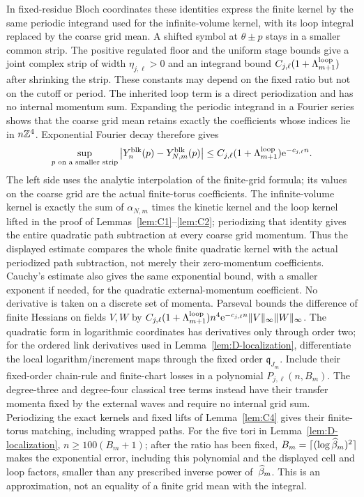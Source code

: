 In fixed-residue Bloch coordinates these identities express the finite kernel by the same periodic integrand used for the infinite-volume kernel, with its loop integral replaced by the coarse grid mean. A shifted symbol at $\theta\pm p$ stays in a smaller common strip. The positive regulated floor and the uniform stage bounds give a joint complex strip of width $\eta_{j,\ell}>0$ and an integrand bound $C_{j,\ell}(1+\Lambda_{m+1}^{\rm loop})$ after shrinking the strip. These constants may depend on the fixed ratio but not on the cutoff or period. The inherited loop term is a direct periodization and has no internal momentum sum. Expanding the periodic integrand in a Fourier series shows that the coarse grid mean retains exactly the coefficients whose indices lie in $n\mathbb{Z}^4$. Exponential Fourier decay therefore gives
\begin{equation*}
\sup_{p\text{ on a smaller strip}}\left|Y^{\rm blk}_{n}(p)-Y^{\rm blk}_{N,m}(p)\right|
\le C_{j,\ell}(1+\Lambda_{m+1}^{\rm loop})\mathrm e^{-c_{j,\ell}n}.
\end{equation*}
The left side uses the analytic interpolation of the finite-grid formula; its values on the coarse grid are the actual finite-torus coefficients. The infinite-volume kernel is exactly the sum of $\alpha_{N,m}$ times the kinetic kernel and the loop kernel lifted in the proof of Lemmas~\ref{lem:C1}--\ref{lem:C2}; periodizing that identity gives the entire quadratic path subtraction at every coarse grid momentum. Thus the displayed estimate compares the whole finite quadratic kernel with the actual periodized path subtraction, not merely their zero-momentum coefficients. Cauchy's estimate also gives the same exponential bound, with a smaller exponent if needed, for the quadratic external-momentum coefficient. No derivative is taken on a discrete set of momenta. Parseval bounds the difference of finite Hessians on fields $V,W$ by $C_{j,\ell}(1+\Lambda_{m+1}^{\rm loop})n^4\mathrm e^{-c_{j,\ell}n}\|V\|_\infty\|W\|_\infty$. The quadratic form in logarithmic coordinates has derivatives only through order two; for the ordered link derivatives used in Lemma~\ref{lem:D-localization}, differentiate the local logarithm/increment maps through the fixed order $\mathfrak q_{J_m}$. Include their fixed-order chain-rule and finite-chart losses in a polynomial $P_{j,\ell}(n,B_m)$. The degree-three and degree-four classical tree terms instead have their transfer momenta fixed by the external waves and require no internal grid sum. Periodizing the exact kernels and fixed lifts of Lemma~\ref{lem:C4} gives their finite-torus matching, including wrapped paths. For the five tori in Lemma~\ref{lem:D-localization}, $n\ge100(B_m+1)$; after the ratio has been fixed, $B_m=\lceil(\log\widehat{\beta}_m)^2\rceil$ makes the exponential error, including this polynomial and the displayed cell and loop factors, smaller than any prescribed inverse power of~$\widehat{\beta}_m$. This is an approximation, not an equality of a finite grid mean with the integral.

